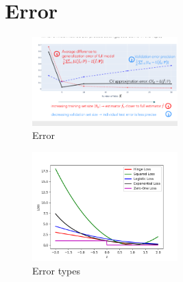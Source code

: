 \documentclass{article}
\begin{document}
\section{Error}
\begin{figure}[h]
    \centering
    \includegraphics[width=0.5\textwidth]{assets/graph_error.png}
    \caption{Error}
\end{figure}
\begin{figure}[h]
    \centering
    \includegraphics[width=0.5\textwidth]{assets/errors.png}
    \caption{Error types}
\end{figure}
\end{document}

